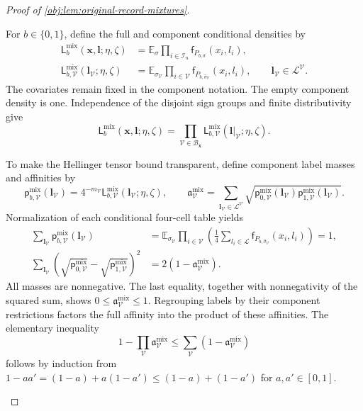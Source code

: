\documentclass[11pt]{article}
\begin{document}
\begin{proof}[Proof of \cref{obj:lem:original-record-mixtures}]
\begin{enumerate}
For \(b\in\{0,1\}\), define the full and component conditional densities
by
\[
\begin{aligned}
\mathsf L_b^{\mathrm{mix}}(\mathbf x,\boldsymbol l;\eta,\zeta)
&=\mathbb E_\sigma
\prod_{i\in\mathcal I_n}
\mathsf f_{P_{b,\sigma}}(x_i,l_i),\\
\mathsf L_{b,\mathcal V}^{\mathrm{mix}}
(\boldsymbol l_{\mathcal V};\eta,\zeta)
&=\mathbb E_{\sigma_{\mathcal V}}
\prod_{i\in\mathcal V}
\mathsf f_{P_{b,\widehat\sigma_{\mathcal V}}}(x_i,l_i),
\qquad
\boldsymbol l_{\mathcal V}\in\mathscr L^{\mathcal V}.
\end{aligned}
\]
The covariates remain fixed in the component notation. The empty
component density is one. Independence of the disjoint sign groups
and finite distributivity give
\[
\mathsf L_b^{\mathrm{mix}}(\mathbf x,\boldsymbol l;\eta,\zeta)
=
\prod_{\mathcal V\in\mathscr B_{\mathbf x}}
\mathsf L_{b,\mathcal V}^{\mathrm{mix}}
(\boldsymbol l|_{\mathcal V};\eta,\zeta).
\]

To make the Hellinger tensor bound transparent, define component label
masses and affinities by
\[
\mathsf p_{b,\mathcal V}^{\mathrm{mix}}(\boldsymbol l_{\mathcal V})
=4^{-m_{\mathcal V}}
\mathsf L_{b,\mathcal V}^{\mathrm{mix}}
(\boldsymbol l_{\mathcal V};\eta,\zeta),
\qquad
\mathfrak a_{\mathcal V}^{\mathrm{mix}}
=
\sum_{\boldsymbol l_{\mathcal V}\in\mathscr L^{\mathcal V}}
\sqrt{\mathsf p_{0,\mathcal V}^{\mathrm{mix}}
(\boldsymbol l_{\mathcal V})
\mathsf p_{1,\mathcal V}^{\mathrm{mix}}
(\boldsymbol l_{\mathcal V})}.
\]
Normalization of each conditional four-cell table yields
\[
\begin{aligned}
\sum_{\boldsymbol l_{\mathcal V}}
\mathsf p_{b,\mathcal V}^{\mathrm{mix}}(\boldsymbol l_{\mathcal V})
&=
\mathbb E_{\sigma_{\mathcal V}}
\prod_{i\in\mathcal V}
\left(\frac14\sum_{l_i\in\mathscr L}
\mathsf f_{P_{b,\widehat\sigma_{\mathcal V}}}(x_i,l_i)\right)
=1,\\
\sum_{\boldsymbol l_{\mathcal V}}
\left(\sqrt{\mathsf p_{0,\mathcal V}^{\mathrm{mix}}}
-\sqrt{\mathsf p_{1,\mathcal V}^{\mathrm{mix}}}\right)^2
&=2(1-\mathfrak a_{\mathcal V}^{\mathrm{mix}}).
\end{aligned}
\]
All masses are nonnegative. The last equality, together with
nonnegativity of the squared sum, shows
\(0\le\mathfrak a_{\mathcal V}^{\mathrm{mix}}\le1\).
Regrouping labels by their component restrictions factors the full
affinity into the product of these affinities. The elementary
inequality
\[
1-\prod_{\mathcal V}\mathfrak a_{\mathcal V}^{\mathrm{mix}}
\le
\sum_{\mathcal V}(1-\mathfrak a_{\mathcal V}^{\mathrm{mix}})
\]
follows by induction from
\(1-aa'=(1-a)+a(1-a')\le(1-a)+(1-a')\) for
\(a,a'\in[0,1]\).


\end{enumerate}
\end{proof}
\end{document}
